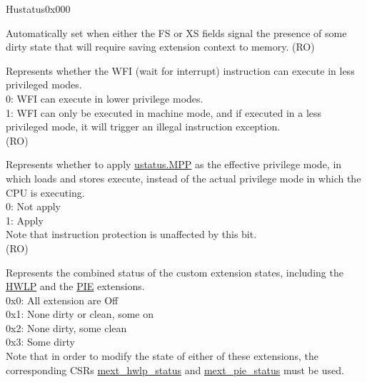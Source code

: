 \begin{register}{H}{ustatus}{0x000}\label{regdesc:USTATUS}
%
%
%
%
%
%
%
%
%
%
%
%
%
%
%
\regnewline%
\begin{regdesc}\begin{reglist}
\label{fielddesc:USTATUS_SD}\item [SD] Automatically set when either the FS or XS fields signal the presence of some dirty state that will require saving extension context to memory. (RO)
\label{fielddesc:USTATUSTW}\item [TW] Represents whether the WFI (wait for interrupt) instruction can execute in less privileged modes. \\
0: WFI can execute in lower privilege modes.\\
1: WFI can only be executed in machine mode, and if executed in a less privileged mode, it will trigger an illegal instruction exception.\\
(RO)
\label{fielddesc:USTATUS_MPRV}\item [MPRV] Represents whether to apply \hyperref[fielddesc:USTATUSMPP]{ustatus.MPP} as the effective privilege mode, in which loads and stores execute, instead of the actual privilege mode in which the CPU is executing. \\
0: Not apply\\
1: Apply\\
Note that instruction protection is unaffected by this bit.\\
(RO)
\label{fielddesc:USTATUS_XS}\item [XS] Represents the combined status of the custom extension states, including the \hyperref[sec:riscvcpu-hwloop]{HWLP} and the \hyperref[sec:riscvcpu-pie]{PIE} extensions. \\
0x0: All extension are Off\\
0x1: None dirty or clean, some on\\
0x2: None dirty, some clean\\
0x3: Some dirty\\
Note that in order to modify the state of either of these extensions, the corresponding CSRs \hyperref[regdesc:MEXT_HWLP_STATUS]{mext\_hwlp\_status} and \hyperref[regdesc:MEXT_PIE_STATUS]{mext\_pie\_status} must be used.\\

\end{reglist}
\end{regdesc}
\end{register}
